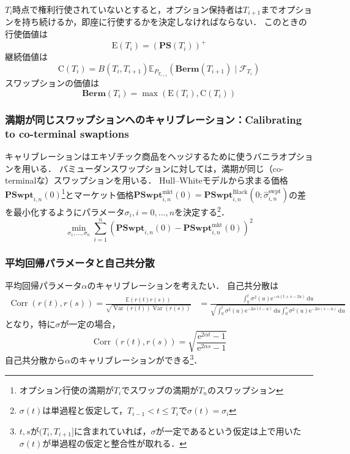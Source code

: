 \documentclass[a4paper, lualatex, ja=standard]{bxjsarticle}
\theoremstyle{theorem}
\theoremstyle{definition}
\theoremstyle{definition}
\newcommand{\E}{\mathbb{E}}
\newcommand{\Berm}{\mathbf{Berm}}
\newcommand{\PS}{\mathbf{PS}}
\newcommand{\PSwpt}{\mathbf{PSwpt}}
\newcommand{\diff}{\mathrm{d}}
\begin{document}
$T_i$時点で権利行使されていないとすると，オプション保持者は$T_{i+1}$までオプションを持ち続けるか，即座に行使するかを決定しなければならない．
このときの行使価値は
\begin{equation*}
  \mathrm{E}(T_i) = (\PS(T_i))^+
\end{equation*}
継続価値は
\begin{equation*}
  \mathrm{C}\left(T_i\right)=B\left(T_i, T_{i+1}\right) \E_{P_{T_{i+1}}}\left(\Berm\left(T_{i+1}\right) \mid \mathcal{F}_{T_i}\right)
\end{equation*}
スワップションの価値は
\begin{equation}
  \Berm\left(T_i\right)=\max \left(\mathrm{E}\left(T_i\right), \mathrm{C}\left(T_i\right)\right)
  \label{eq:3.30}
\end{equation}

\subsubsection{満期が同じスワップションへのキャリブレーション：Calibrating to co-terminal swaptions}
キャリブレーションはエキゾチック商品をヘッジするために使うバニラオプションを用いる．
バミューダンスワップションに対しては，満期が同じ（co-terminalな）スワップションを用いる．
Hull--Whiteモデルから求まる価格$\PSwpt_{i,n}(0)$\footnote{オプション行使の満期が$T_i$でスワップの満期が$T_n$のスワップション}とマーケット価格$\PSwpt_{i,n}^\mathrm{mkt}(0)=\PSwpt_{i,n}^\mathrm{Black}(0;\hat{\sigma}_{i,n}^\mathrm{swpt})$の差を最小化するようにパラメータ$\sigma_i, i=0,\ldots, n$を決定する\footnote{$\sigma(t)$は単過程と仮定して，$T_{i-1}<t\leq T_i$で$\sigma(t)=\sigma_i$}．
\begin{equation*}
  \min_{\sigma_1,\ldots,\sigma_n} \sum_{i=1}^n \left(\PSwpt_{i,n}(0) - \PSwpt_{i,n}^\mathrm{mkt}(0)\right)^2
\end{equation*}

\subsubsection*{平均回帰パラメータと自己共分散}
平均回帰パラメータ$\alpha$のキャリブレーションを考えたい．
自己共分散は
\begin{align*} 
  \operatorname{Corr}(r(t), r(s))  =\frac{\E(r(t) r(s))}{\sqrt{\operatorname{Var}(r(t)) \operatorname{Var}(r(s))}}  
  & =\frac{\int_0^t \sigma^2(u) \mathrm{e}^{-\alpha(t+s-2 u)} \,\diff u}{\sqrt{\int_0^t \sigma^2(u) \mathrm{e}^{-2 \alpha(t-u)} \,\diff u \int_0^s \sigma^2(u) \mathrm{e}^{-2 \alpha(s-u)} \,\diff u}}
\end{align*}
となり，特に$\sigma$が一定の場合，
\begin{equation*}
  \operatorname{Corr}(r(t), r(s)) = \sqrt{\frac{\mathrm{e}^{2\alpha t}-1}{\mathrm{e}^{2\alpha s}-1}}
\end{equation*}
自己共分散から$\alpha$のキャリブレーションができる\footnote{$t,s$が$(T_i,T_{i+1}]$に含まれていれば，$\sigma$が一定であるという仮定は上で用いた$\sigma(t)$が単過程の仮定と整合性が取れる．}．
\end{document}

